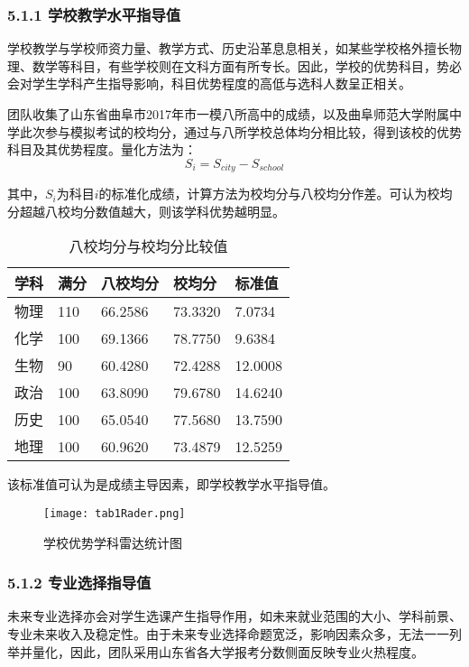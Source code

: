 \documentclass[bwprint]{cumcmthesis}
\begin{document}
\subsubsection{5.1.1 学校教学水平指导值}
学校教学与学校师资力量、教学方式、历史沿革息息相关，如某些学校格外擅长物理、数学等科目，有些学校则在文科方面有所专长。因此，学校的优势科目，势必会对学生学科产生指导影响，科目优势程度的高低与选科人数呈正相关。

团队收集了山东省曲阜市2017年市一模八所高中的成绩，以及曲阜师范大学附属中学此次参与模拟考试的校均分，通过与八所学校总体均分相比较，得到该校的优势科目及其优势程度。量化方法为：
\begin{equation}
	S_i = {S_{city}-S_{school}}
\end{equation}

其中，$ S_i $为科目$ i $的标准化成绩，计算方法为校均分与八校均分作差。可认为校均分超越八校均分数值越大，则该学科优势越明显。

\begin{table}[htbp]
	\centering
	\caption{八校均分与校均分比较值}
	\begin{tabular}{p{1.5cm}p{1.5cm}p{2.5cm}p{2.5cm}p{2.5cm}}
		\toprule
		学科    & 满分    & 八校均分   & 校均分   & 标准值 \\
		\midrule
		物理    & 110   & 66.2586  & 73.3320  & 7.0734  \\
		化学    & 100   & 69.1366  & 78.7750  & 9.6384  \\
		生物    & 90    & 60.4280  & 72.4288  & 12.0008  \\
		政治    & 100   & 63.8090  & 79.6780  & 14.6240  \\
		历史    & 100   & 65.0540  & 77.5680  & 13.7590  \\
		地理    & 100   & 60.9620  & 73.4879  & 12.5259  \\
		\bottomrule
	\end{tabular}%
	\label{tab:score}%
\end{table}%

该标准值可认为是成绩主导因素，即学校教学水平指导值。

\begin{figure}[!h]
	\centering
	\texttt{[image: tab1Rader.png]}
	\caption{学校优势学科雷达统计图}
\end{figure}

\subsubsection{5.1.2 专业选择指导值}
未来专业选择亦会对学生选课产生指导作用，如未来就业范围的大小、学科前景、专业未来收入及稳定性。由于未来专业选择命题宽泛，影响因素众多，无法一一列举并量化，因此，团队采用山东省各大学报考分数侧面反映专业火热程度。
\end{document}
